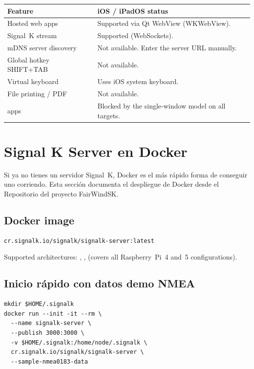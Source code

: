 \begin{longtable}{L{5.2cm}L{8.5cm}}
\toprule
{}
\color{white}\sffamily\bfseries Feature &
\color{white}\sffamily\bfseries iOS / iPadOS status \\
\midrule
Hosted web apps          & Supported via Qt WebView (WKWebView). \\
Signal~K stream          & Supported (WebSockets). \\
mDNS server discovery    & Not available. Enter the server URL manually. \\
Global hotkey SHIFT+TAB  & Not available. \\
Virtual keyboard         & Uses iOS system keyboard. \\
File printing / PDF      & Not available. \\
 apps      & Blocked by the single-window model on all targets. \\
\bottomrule
\end{longtable}

\section{Signal K Server en Docker}
\label{app:signalk-docker}

Si ya no tienes un servidor Signal~K, Docker es el más rápido
forma de conseguir uno corriendo.
Esta sección documenta el despliegue de Docker desde el
Repositorio del proyecto FairWindSK.

\subsection{Docker image}

\begin{lstlisting}
cr.signalk.io/signalk/signalk-server:latest
\end{lstlisting}

Supported architectures: , ,
 (covers all Raspberry~Pi~4 and~5 configurations).

\subsection{Inicio rápido con datos demo NMEA}

\begin{lstlisting}
mkdir $HOME/.signalk
docker run --init -it --rm \
  --name signalk-server \
  --publish 3000:3000 \
  -v $HOME/.signalk:/home/node/.signalk \
  cr.signalk.io/signalk/signalk-server \
  --sample-nmea0183-data
\end{lstlisting}

